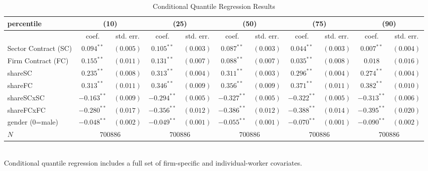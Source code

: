 \begin{landscape}
\begin{table}[]
\scriptsize
\centering
\caption{Conditional Quantile Regression Results}
\label{CQRresults}
\begin{tabular}{l|cccccccccc}
 percentile & \multicolumn{2}{c}{(10)} & \multicolumn{2}{c}{(25)} & \multicolumn{2}{c}{(50)} & \multicolumn{2}{c}{(75)} & \multicolumn{2}{c}{(90)}\\
\hline
                & coef.             & std. err. & coef.     & std. err.         & coef.             & std. err. & coef.         & std. err. & coef.         & std. err. \\
\hline
Sector Contract (SC)    & $0.094^{**}$      & $(0.005)$ & $0.105^{**}$   & $(0.003)$    & $0.087^{**}$      & $(0.003)$ & $0.044^{**}$  & $(0.003)$ & $0.007^{**}$  & $(0.004)$\\
Firm Contract (FC)      & $0.155^{**}$      & $(0.011)$ & $0.131^{**}$   & $(0.007)$    & $0.088^{**}$      & $(0.007)$ & $0.035^{**}$  & $(0.008)$ & $0.018$       & $(0.016)$\\
shareSC                 & $0.235^{**}$      & $(0.008)$ & $0.313^{**}$   & $(0.004)$    & $0.311^{**}$      & $(0.003)$ & $0.296^{**}$  & $(0.004)$ & $0.274^{**}$  & $(0.004)$\\
shareFC                 & $0.313^{**}$      & $(0.011)$ & $0.346^{**}$   & $(0.009)$    & $0.356^{**}$      & $(0.009)$ & $0.371^{**}$  & $(0.011)$ & $0.382^{**}$  & $(0.010)$\\
shareSCxSC              & $-0.163^{**}$     & $(0.009)$ & $-0.294^{**}$  & $(0.005)$    & $-0.327^{**}$     & $(0.005)$ & $-0.322^{**}$ & $(0.005)$ & $-0.313^{**}$ & $(0.006)$\\
shareFCxFC              & $-0.280^{**}$     & $(0.017)$ & $-0.356^{**}$  & $(0.012)$    & $-0.386^{**}$     & $(0.012)$ & $-0.388^{**}$ & $(0.014)$ & $-0.395^{**}$ & $(0.020)$\\
gender (0=male)         & $-0.048^{**}$     & $(0.002)$ & $-0.049^{**}$  & $(0.001)$    & $-0.055^{**}$     & $(0.001)$ & $-0.070^{**}$ & $(0.001)$ & $-0.090^{**}$ & $(0.002)$\\
\hline
$N$                     & \multicolumn{2}{c}{700886} & \multicolumn{2}{c}{700886} & \multicolumn{2}{c}{700886} & \multicolumn{2}{c}{700886} & \multicolumn{2}{c}{700886} \\
\hline
\end{tabular}\\
\bigskip
Conditional quantile regression includes a full set of firm-specific and individual-worker covariates.\\

\end{table}
\end{landscape}
